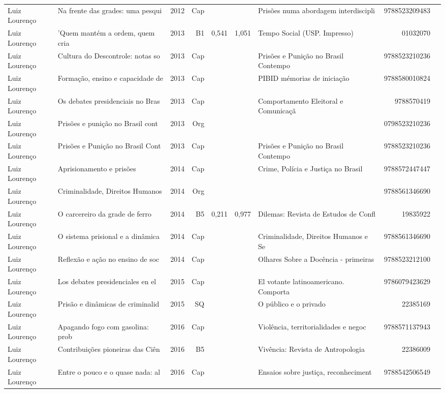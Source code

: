 \documentclass[12pt,brazil]{article}\usepackage[]{graphicx}\usepackage[]{xcolor}
\begin{document}
\begin{longtable}{lllrrllrr}
Luiz Lourenço & Na frente das grades: uma pesqui & 2012 & Cap &  &  & Prisões numa abordagem interdiscipli & 9788523209483 \\
Luiz Lourenço & ’Quem mantém a ordem, quem cria  & 2013 & B1 & 0,541 & 1,051 & Tempo Social (USP. Impresso) & 01032070 \\
Luiz Lourenço & Cultura do Descontrole: notas so & 2013 & Cap &  &  & Prisões e Punição no Brasil Contempo & 9788523210236 \\
Luiz Lourenço & Formação, ensino e capacidade de & 2013 & Cap &  &  & PIBID mémorias de iniciação & 9788580010824 \\
Luiz Lourenço & Os debates presidenciais no Bras & 2013 & Cap &  &  & Comportamento Eleitoral e Comunicaçã & 9788570419 \\
\rowcolor{ninval}Luiz Lourenço & Prisões e punição no Brasil cont & 2013 & Org &  &  &  & 0798523210236 \\
Luiz Lourenço & Prisões e Punição no Brasil Cont & 2013 & Cap &  &  & Prisões e Punição no Brasil Contempo & 9788523210236 \\
Luiz Lourenço & Aprisionamento e prisões & 2014 & Cap &  &  & Crime, Polícia e Justiça no Brasil & 9788572447447 \\
Luiz Lourenço & Criminalidade, Direitos Humanos  & 2014 & Org &  &  &  & 9788561346690 \\
Luiz Lourenço & O carcereiro da grade de ferro & 2014 & B5 & 0,211 & 0,977 & Dilemas: Revista de Estudos de Confl & 19835922 \\
Luiz Lourenço & O sistema prisional e a dinâmica & 2014 & Cap &  &  & Criminalidade, Direitos Humanos e Se & 9788561346690 \\
Luiz Lourenço & Reflexão e ação no ensino de soc & 2014 & Cap &  &  & Olhares Sobre a Docência - primeiras & 9788523212100 \\
Luiz Lourenço & Los debates presidenciales en el & 2015 & Cap &  &  & El votante latinoamericano. Comporta & 9786079423629 \\
Luiz Lourenço & Prisão e dinâmicas de criminalid & 2015 & SQ &  &  & O público e o privado & 22385169 \\
Luiz Lourenço & Apagando fogo com gasolina: prob & 2016 & Cap &  &  & Violência, territorialidades e negoc & 9788571137943 \\
Luiz Lourenço & Contribuições pioneiras das Ciên & 2016 & B5 &  &  & Vivência: Revista de Antropologia & 22386009 \\
Luiz Lourenço & Entre o pouco e o quase nada: al & 2016 & Cap &  &  & Ensaios sobre justiça, reconheciment & 9788542506549 \\

\end{longtable}
\end{document}
